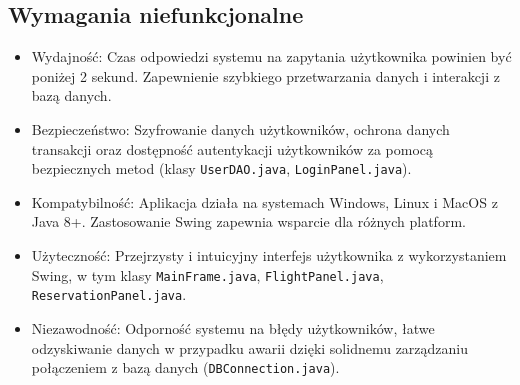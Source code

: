 \subsection{Wymagania niefunkcjonalne}
\begin{itemize}
\item Wydajność: Czas odpowiedzi systemu na zapytania użytkownika powinien być poniżej 2 sekund. Zapewnienie szybkiego przetwarzania danych i interakcji z bazą danych.
\item Bezpieczeństwo: Szyfrowanie danych użytkowników, ochrona danych transakcji oraz dostępność autentykacji użytkowników za pomocą bezpiecznych metod (klasy \texttt{UserDAO.java}, \texttt{LoginPanel.java}).
\item Kompatybilność: Aplikacja działa na systemach Windows, Linux i MacOS z Java 8+. Zastosowanie Swing zapewnia wsparcie dla różnych platform.
\item Użyteczność: Przejrzysty i intuicyjny interfejs użytkownika z wykorzystaniem Swing, w tym klasy \texttt{MainFrame.java}, \texttt{FlightPanel.java}, \texttt{ReservationPanel.java}.
\item Niezawodność: Odporność systemu na błędy użytkowników, łatwe odzyskiwanie danych w przypadku awarii dzięki solidnemu zarządzaniu połączeniem z bazą danych (\texttt{DBConnection.java}).
\end{itemize}